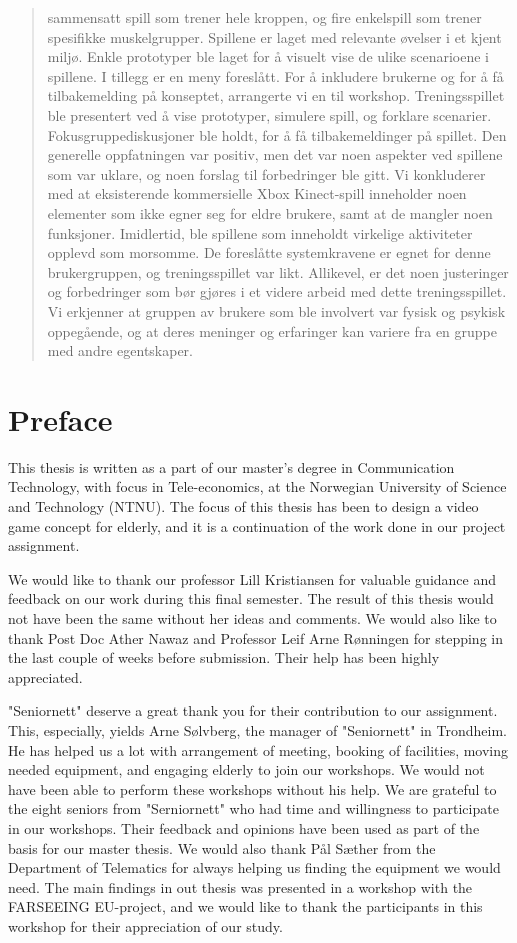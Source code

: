 \documentclass[b5paper,twoside,openright,11pt]{report}
\begin{document}
\begin{abstract}
sammensatt spill som trener hele kroppen, og fire enkelspill som trener spesifikke muskelgrupper. Spillene er laget med relevante øvelser i et kjent miljø. Enkle prototyper ble laget for å visuelt vise de ulike scenarioene i spillene. I tillegg er en meny foreslått. For å inkludere brukerne og for å få tilbakemelding på konseptet, arrangerte vi en til workshop. Treningsspillet ble presentert ved å vise prototyper, simulere spill, og forklare scenarier. Fokusgruppediskusjoner ble holdt, for å få tilbakemeldinger på spillet. Den generelle oppfatningen var positiv, men det var noen aspekter ved spillene som var uklare, og noen forslag til forbedringer ble gitt. Vi konkluderer med at eksisterende kommersielle Xbox Kinect-spill inneholder noen elementer som ikke egner seg for eldre brukere, samt at de mangler noen funksjoner. Imidlertid, ble spillene som inneholdt virkelige aktiviteter opplevd som morsomme. De foreslåtte systemkravene er egnet for denne brukergruppen, og treningsspillet var likt. Allikevel, er det noen justeringer og forbedringer som bør gjøres i et videre arbeid med dette treningsspillet. Vi erkjenner at gruppen av brukere som ble involvert var fysisk og psykisk oppegående, og at deres meninger og erfaringer kan variere fra en gruppe med andre egentskaper. 
\end{abstract}
\cleardoublepage
\chapter*{Preface}
This thesis is written as a part of our master's degree in Communication Technology, with focus in Tele-economics, at the Norwegian University of Science and Technology (NTNU). The focus of this thesis has been to design a video game concept for elderly, and it is a continuation of the work done in our project assignment. 

We would like to thank our professor Lill Kristiansen for valuable guidance and feedback on our work during this final semester. The result of this thesis would not have been the same without her ideas and comments. We would also like to thank Post Doc Ather Nawaz and Professor Leif Arne Rønningen for stepping in the last couple of weeks before submission. Their help has been highly appreciated.  

"Seniornett" deserve a great thank you for their contribution to our assignment. This, especially, yields Arne Sølvberg, the manager of "Seniornett" in Trondheim. He has helped us a lot with arrangement of meeting, booking of facilities, moving needed equipment, and engaging elderly to join our workshops. We would not have been able to perform these workshops without his help. We are grateful to the eight seniors from "Serniornett" who had time and willingness to participate in our workshops. Their feedback and opinions have been used as part of the basis for our master thesis. We would also thank Pål Sæther from the Department of Telematics for always helping us finding the equipment we would need. The main findings in out thesis was presented in a workshop with the FARSEEING EU-project, and we would like to thank the participants in this workshop for their appreciation of our study. 
\end{document}
